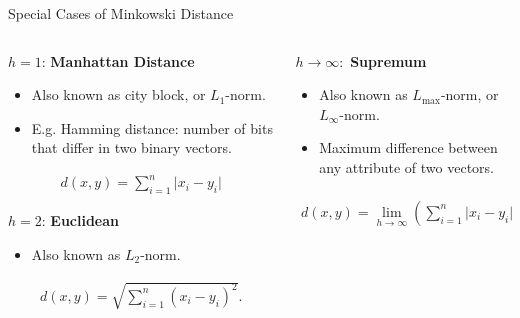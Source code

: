\begin{frame}{Special Cases of Minkowski Distance}
  \begin{columns}
    \begin{column}{0.5\textwidth}
      $h=1$: \textbf{Manhattan Distance}
      \begin{itemize}
      \item Also known as city block, or $L_1$-norm.
      \item E.g. Hamming distance: number of bits that differ in two binary
        vectors.
      \end{itemize}
      \vspace*{-1.5em}
      \begin{align*}
        d(x,y) = \sum_{i=1}^{n} \vert x_i - y_i \vert
      \end{align*}

      $h=2$: \textbf{Euclidean}
      \begin{itemize}
      \item Also known as $L_2$-norm.
      \end{itemize}
      \vspace*{-1.5em}
      \begin{align*}
        d(x,y) = \sqrt{\sum_{i=1}^{n} (x_i-y_i)^2}.
      \end{align*}
    \end{column}

    \begin{column}{0.5\textwidth}
      $h \rightarrow \infty:$ \textbf{Supremum}
      \begin{itemize}
      \item Also known as $L_{\text{max}}$-norm, or $L_\infty$-norm.
      \item Maximum difference between any attribute of two vectors.
      \end{itemize}
      \vspace*{-1.5em}
      \begin{align*}
        d(x,y) = \lim_{h \rightarrow \infty} \left( \sum_{i=1}^{n} \vert x_i - y_i \vert^{h} \right)^{\frac{1}{h}} = \max_i \vert x_i-y_i \vert.
      \end{align*}
    \end{column}
  \end{columns}
\end{frame}

